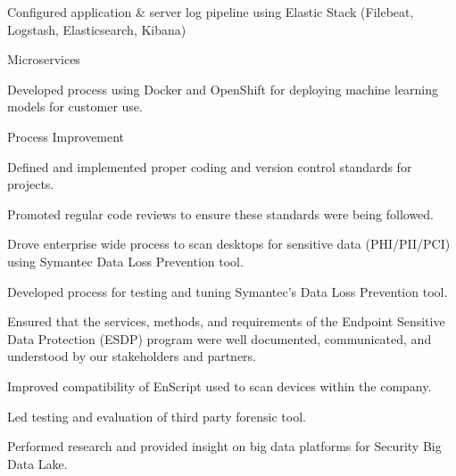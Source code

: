 \documentclass[]{deedy-resume-openfont}
\begin{document}
\begin{tightemize}
\begin{tightemize}
    \item Configured application \& server log pipeline using Elastic Stack (Filebeat, Logstash, Elasticsearch, Kibana)
    \end{tightemize}
    \vspace{\topsep}
\item Microservices
    \vspace{\topsep}
    \begin{tightemize}
    \item Developed process using Docker and OpenShift for deploying machine learning models for customer use.
    \end{tightemize}
    \vspace{\topsep}
\item Process Improvement
    \vspace{\topsep}
    \begin{tightemize}
    \item Defined and implemented proper coding and version control standards for projects.
    \item Promoted regular code reviews to ensure these standards were being followed.
    \end{tightemize}
    \vspace{\topsep}
\end{tightemize}
\sectionsep

\vspace{\topsep} 
\begin{tightemize}
\item Drove enterprise wide process to scan desktops for sensitive data (PHI/PII/PCI) using Symantec Data Loss Prevention tool.
\item Developed process for testing and tuning Symantec's Data Loss Prevention tool.
\item Ensured that the services, methods, and requirements of the Endpoint Sensitive Data Protection (ESDP) program were well documented, communicated, and understood by our stakeholders and partners.
\end{tightemize}
\sectionsep

\vspace{\topsep} 
\begin{tightemize}
\item Improved compatibility of EnScript used to scan devices within the company.
\item Led testing and evaluation of third party forensic tool.
\item Performed research and provided insight on big data platforms for Security Big Data Lake.
\end{tightemize}
\sectionsep
\end{document}
